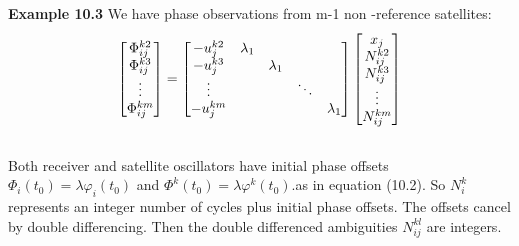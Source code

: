 \textbf{Example 10.3} We have phase observations from m-1 non -reference satellites:
\begin{equation}
\begin{bmatrix}
\Phi_{ij}^{k2}\\
\Phi_{ij}^{k3}\\
\vdots \\
\Phi_{ij}^{km}
\end{bmatrix}
=\begin{bmatrix}
-u_{j}^{k2}&\lambda_{1}\\
-u_{j}^{k3}&           &\lambda_{1}\\
\vdots     &           &  &\ddots\\
-u_{j}^{km} & &\multicolumn{2}{c}{\raisebox{1.3ex}[0pt]{\Huge}} & \lambda_{1}
\end{bmatrix}
\begin{bmatrix}
x_{j}\\
N_{ij}^{k2}\\
N_{ij}^{k3}\\
\vdots\\
N_{ij}^{km}
\end{bmatrix}
\end{equation}\\
Both receiver and satellite oscillators have initial phase offsets $\Phi_{i}(t_{0})=\lambda\varphi_{i}(t_{0})$ and $\Phi^{k}(t_{0})=\lambda\varphi^{k}(t_{0})$.as in equation (10.2). So $N_{i}^{k}$ represents an integer number of cycles plus initial phase offsets. The offsets cancel by double differencing. Then the double differenced ambiguities $N_{ij}^{kl}$ are integers.


